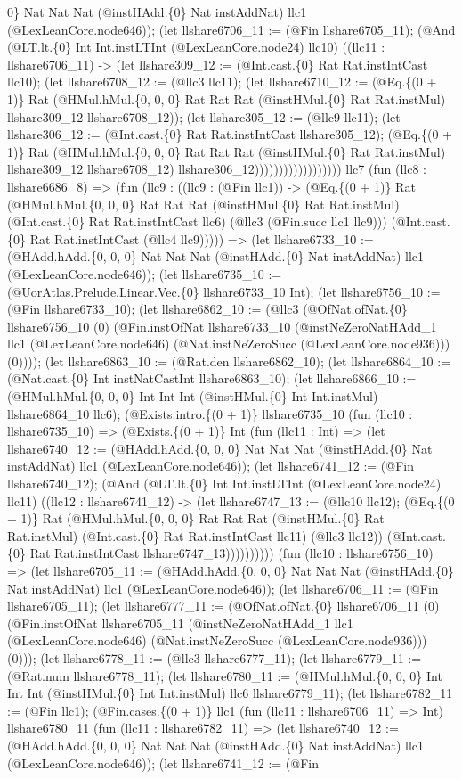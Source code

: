 \documentclass[11pt]{article}
\begin{document}
0\} Nat Nat Nat (@instHAdd.\{0\} Nat instAddNat) llc1 (@LexLeanCore.node646)); (let llshare6706\_11 := (@Fin llshare6705\_11); (@And (@LT.lt.\{0\} Int Int.instLTInt (@LexLeanCore.node24) llc10) ((llc11 : llshare6706\_11) -> (let llshare309\_12 := (@Int.cast.\{0\} Rat Rat.instIntCast llc10); (let llshare6708\_12 := (@llc3 llc11); (let llshare6710\_12 := (@Eq.\{(0 + 1)\} Rat (@HMul.hMul.\{0, 0, 0\} Rat Rat Rat (@instHMul.\{0\} Rat Rat.instMul) llshare309\_12 llshare6708\_12)); (let llshare305\_12 := (@llc9 llc11); (let llshare306\_12 := (@Int.cast.\{0\} Rat Rat.instIntCast llshare305\_12); (@Eq.\{(0 + 1)\} Rat (@HMul.hMul.\{0, 0, 0\} Rat Rat Rat (@instHMul.\{0\} Rat Rat.instMul) llshare309\_12 llshare6708\_12) llshare306\_12)))))))))))))))))) llc7 (fun (llc8 : llshare6686\_8) => (fun (llc9 : ((llc9 : (@Fin llc1)) -> (@Eq.\{(0 + 1)\} Rat (@HMul.hMul.\{0, 0, 0\} Rat Rat Rat (@instHMul.\{0\} Rat Rat.instMul) (@Int.cast.\{0\} Rat Rat.instIntCast llc6) (@llc3 (@Fin.succ llc1 llc9))) (@Int.cast.\{0\} Rat Rat.instIntCast (@llc4 llc9))))) => (let llshare6733\_10 := (@HAdd.hAdd.\{0, 0, 0\} Nat Nat Nat (@instHAdd.\{0\} Nat instAddNat) llc1 (@LexLeanCore.node646)); (let llshare6735\_10 := (@UorAtlas.Prelude.Linear.Vec.\{0\} llshare6733\_10 Int); (let llshare6756\_10 := (@Fin llshare6733\_10); (let llshare6862\_10 := (@llc3 (@OfNat.ofNat.\{0\} llshare6756\_10 (0) (@Fin.instOfNat llshare6733\_10 (@instNeZeroNatHAdd\_1 llc1 (@LexLeanCore.node646) (@Nat.instNeZeroSucc (@LexLeanCore.node936))) (0)))); (let llshare6863\_10 := (@Rat.den llshare6862\_10); (let llshare6864\_10 := (@Nat.cast.\{0\} Int instNatCastInt llshare6863\_10); (let llshare6866\_10 := (@HMul.hMul.\{0, 0, 0\} Int Int Int (@instHMul.\{0\} Int Int.instMul) llshare6864\_10 llc6); (@Exists.intro.\{(0 + 1)\} llshare6735\_10 (fun (llc10 : llshare6735\_10) => (@Exists.\{(0 + 1)\} Int (fun (llc11 : Int) => (let llshare6740\_12 := (@HAdd.hAdd.\{0, 0, 0\} Nat Nat Nat (@instHAdd.\{0\} Nat instAddNat) llc1 (@LexLeanCore.node646)); (let llshare6741\_12 := (@Fin llshare6740\_12); (@And (@LT.lt.\{0\} Int Int.instLTInt (@LexLeanCore.node24) llc11) ((llc12 : llshare6741\_12) -> (let llshare6747\_13 := (@llc10 llc12); (@Eq.\{(0 + 1)\} Rat (@HMul.hMul.\{0, 0, 0\} Rat Rat Rat (@instHMul.\{0\} Rat Rat.instMul) (@Int.cast.\{0\} Rat Rat.instIntCast llc11) (@llc3 llc12)) (@Int.cast.\{0\} Rat Rat.instIntCast llshare6747\_13)))))))))) (fun (llc10 : llshare6756\_10) => (let llshare6705\_11 := (@HAdd.hAdd.\{0, 0, 0\} Nat Nat Nat (@instHAdd.\{0\} Nat instAddNat) llc1 (@LexLeanCore.node646)); (let llshare6706\_11 := (@Fin llshare6705\_11); (let llshare6777\_11 := (@OfNat.ofNat.\{0\} llshare6706\_11 (0) (@Fin.instOfNat llshare6705\_11 (@instNeZeroNatHAdd\_1 llc1 (@LexLeanCore.node646) (@Nat.instNeZeroSucc (@LexLeanCore.node936))) (0))); (let llshare6778\_11 := (@llc3 llshare6777\_11); (let llshare6779\_11 := (@Rat.num llshare6778\_11); (let llshare6780\_11 := (@HMul.hMul.\{0, 0, 0\} Int Int Int (@instHMul.\{0\} Int Int.instMul) llc6 llshare6779\_11); (let llshare6782\_11 := (@Fin llc1); (@Fin.cases.\{(0 + 1)\} llc1 (fun (llc11 : llshare6706\_11) => Int) llshare6780\_11 (fun (llc11 : llshare6782\_11) => (let llshare6740\_12 := (@HAdd.hAdd.\{0, 0, 0\} Nat Nat Nat (@instHAdd.\{0\} Nat instAddNat) llc1 (@LexLeanCore.node646)); (let llshare6741\_12 := (@Fin 
\end{document}
